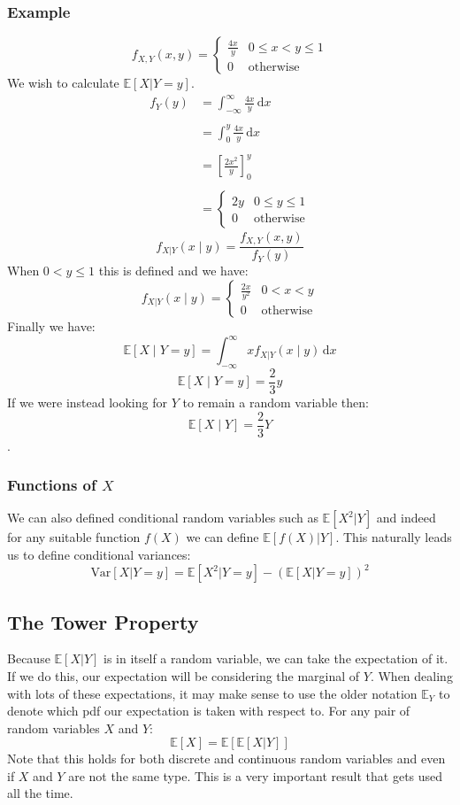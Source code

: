 \documentclass[12pt]{article}
\begin{document}
\subsubsection*{Example}
\[f_{X,Y}(x,y)=\begin{cases}
    \frac{4x}{y} & 0\leq x< y \leq 1 \\
    0&\text{otherwise}
\end{cases}\]
We wish to calculate \(\mathbb{E}[X|Y=y]\).
\begin{align*}
    f_Y(y)&=\int^\infty_{-\infty}\frac{4x}{y}\,\text{d}x \\\\
    &=\int^y_0\frac{4x}{y}\,\text{d}x \\\\
    &=\left[\frac{2x^2}{y}\right]^y_0 \\\\
    &=\begin{cases}
        2y & 0\leq y \leq 1 \\
        0&\text{otherwise}
    \end{cases}
\end{align*}
\[f_{X|Y}(x\mid y)=\frac{f_{X,Y}(x,y)}{f_Y(y)}\]
When \(0<y\leq 1\) this is defined and we have:
\[f_{X|Y}(x\mid y)=\begin{cases}
    \frac{2x}{y^2} & 0<x<y \\
    0&\text{otherwise}
\end{cases}\]
Finally we have:
\[\mathbb{E}[X\mid Y=y]=\int^\infty_{-\infty}xf_{X|Y}(x\mid y)\,\text{d}x\]
\[\mathbb{E}[X\mid Y=y]=\frac{2}{3}y\]
If we were instead looking for \(Y\) to remain a random variable then:
\[\mathbb{E}[X\mid Y]=\frac{2}{3}Y\].
\subsubsection{Functions of \(X\)}
We can also defined conditional random variables such as \(\mathbb{E}[X^2|Y]\) and indeed for any suitable function \(f(X)\) we can define \(\mathbb{E}[f(X)|Y]\). This naturally leads us to define conditional variances:
\[\text{Var}[X|Y=y]=\mathbb{E}[X^2|Y=y]-(\mathbb{E}[X|Y=y])^2\]
\subsection{The Tower Property}
Because \(\mathbb{E}[X|Y]\) is in itself a random variable, we can take the expectation of it. If we do this, our expectation will be considering the marginal of \(Y\). When dealing with lots of these expectations, it may make sense to use the older notation \(\mathbb{E}_Y\) to denote which pdf our expectation is taken with respect to. For any pair of random variables \(X\) and \(Y\):
\[\mathbb{E}[X]=\mathbb{E}[\mathbb{E}[X|Y]]\]
Note that this holds for both discrete and continuous random variables and even if \(X\) and \(Y\) are not the same type. This is a very important result that gets used all the time.
\end{document}
